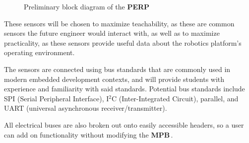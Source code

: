 \documentclass[letterpaper]{article}
\newcommand{\MPB}{\textbf{MPB}\,}
\newcommand{\PERP}{\textbf{PERP}\,}
\begin{document}
\begin{figure}[!htp] 
\caption{Preliminary block diagram of the \PERP}
\label{fig:block_diagram}
\end{figure} 

These sensors will be chosen to maximize teachability, as these are common sensors the future engineer would interact with, as well as to maximize practicality, as these sensors provide useful data about the robotics platform's operating environment.

The sensors are connected using bus standards that are commonly used in modern embedded development contexts, and will provide students with experience and familiarity with said standards. Potential bus standards include SPI (Serial Peripheral Interface), I$^2$C (Inter-Integrated Circuit), parallel, and UART (universal asynchronous receiver/transmitter).

All electrical buses are also broken out onto easily accessible headers, so a user can add on functionality without modifying the \MPB.
\end{document}
